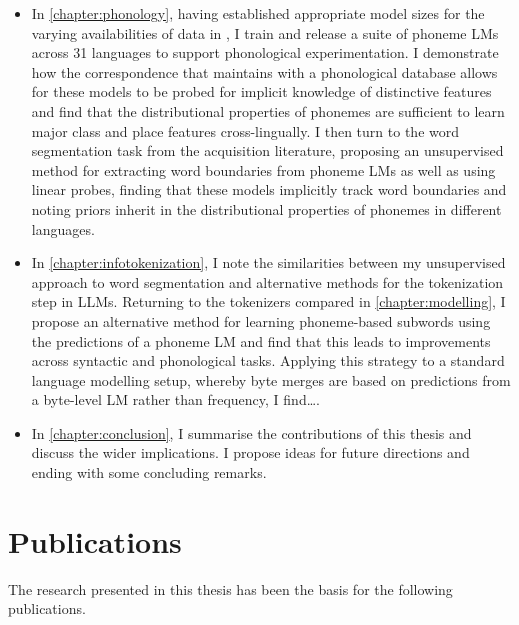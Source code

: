 \begin{itemize}
    \item In \cref{chapter:phonology}, having established appropriate model sizes for the varying availabilities of data in \ipachildes, I train and release a suite of phoneme LMs across 31 languages to support phonological experimentation. I demonstrate how the correspondence that \gpp maintains with a phonological database allows for these models to be probed for implicit knowledge of distinctive features and find that the distributional properties of phonemes are sufficient to learn major class and place features cross-lingually. I then turn to the word segmentation task from the acquisition literature, proposing an unsupervised method for extracting word boundaries from phoneme LMs as well as using linear probes, finding that these models implicitly track word boundaries and noting priors inherit in the distributional properties of phonemes in different languages.
    \item In \cref{chapter:infotokenization}, I note the similarities between my unsupervised approach to word segmentation and alternative methods for the tokenization step in LLMs. Returning to the tokenizers compared in \cref{chapter:modelling}, I propose an alternative method for learning phoneme-based subwords using the predictions of a phoneme LM and find that this leads to improvements across syntactic and phonological tasks. Applying this strategy to a standard language modelling setup, whereby byte merges are based on predictions from a byte-level LM rather than frequency, I find\ldots {}. 
    \item In \cref{chapter:conclusion}, I summarise the contributions of this thesis and discuss the wider implications. I propose ideas for future directions and ending with some concluding remarks.
\end{itemize}

\section{Publications}

The research presented in this thesis has been the basis for the following publications.

